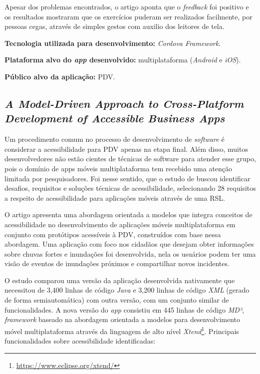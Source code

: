 Apesar dos problemas encontrados, o artigo aponta que o \emph{feedback} foi positivo e os resultados mostraram que os exercícios puderam ser realizados facilmente, por pessoas cegas, através de simples gestos com auxilio dos leitores de tela.

\textbf{Tecnologia utilizada para desenvolvimento:} \emph{Cordova Framework}.

\textbf{Plataforma alvo do \emph{app} desenvolvido:} multiplataforma (\emph{Android} e \emph{iOS}).

\textbf{Público alvo da aplicação:} PDV\@.

\subsection{\emph{A Model-Driven Approach to Cross-Platform Development of Accessible Business Apps}}

Um procedimento comum no processo de desenvolvimento de \emph{software} é considerar a acessibilidade para PDV apenas na etapa final.
Além disso, muitos desenvolvedores não estão cientes de técnicas de software para atender esse grupo, pois o domínio de apps móveis multiplataforma tem recebido uma atenção limitada por pesquisadores.
Foi nesse sentido, que o estudo de  buscou identificar desafios, requisitos e soluções técnicas de acessibilidade, selecionando 28 requisitos a respeito de acessibilidade para aplicações móveis através de uma RSL\@.

O artigo apresenta uma abordagem orientada a modelos que integra conceitos de acessibilidade no desenvolvimento de aplicações móveis multiplataforma em conjunto com protótipos acessíveis à PDV, construídos com base nessa abordagem.
Uma aplicação com foco nos cidadãos que desejam obter informações sobre chuvas fortes e inundações foi desenvolvida, nela os usuários podem ter uma visão de eventos de inundações próximos e compartilhar novos incidentes.

O estudo comparou uma versão da aplicação desenvolvida nativamente que necessitou de 3,400 linhas de código \emph{Java} e 3,200 linhas de código \emph{XML} (gerado de forma semiautomática) com outra versão, com um conjunto similar de funcionalidades.
A nova versão do \emph{app} consistiu em 445 linhas de código \emph{MD²}, \emph{framework} baseado na abordagem orientada a modelos para desenvolvimento móvel multiplataforma através da linguagem de alto nível \emph{Xtend}\footnote{\url{https://www.eclipse.org/xtend/}}.
Principais funcionalidades sobre acessibilidade identificadas:

